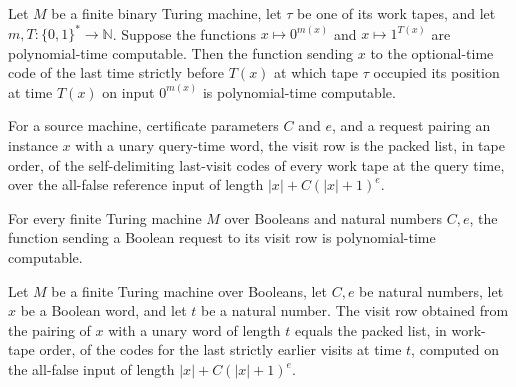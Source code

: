 \begin{lemma}
\label{Complexity.clPrev_native}
\leanok
{}
Let $M$ be a finite binary Turing machine, let $\tau$ be one of its work tapes, and let
$m,T:\{0,1\}^*\to\mathbb{N}$. Suppose the functions $x\mapsto 0^{m(x)}$ and $x\mapsto
1^{T(x)}$ are polynomial-time computable. Then the function sending $x$ to the
optional-time code of the last time strictly before $T(x)$ at which tape $\tau$ occupied
its position at time $T(x)$ on input $0^{m(x)}$ is polynomial-time computable.
\end{lemma}

\begin{definition}
\label{Complexity.clVisitRow}
\leanok
{}
For a source machine, certificate parameters $C$ and $e$, and a request pairing an instance $x$ with a unary query-time word, the visit row is the packed list, in tape order, of the self-delimiting last-visit codes of every work tape at the query time, over the all-false reference input of length $|x| + C(|x|+1)^e$.
\end{definition}

\begin{lemma}
\label{Complexity.clVisitRow_native}
\leanok
{}
For every finite Turing machine $M$ over Booleans and natural numbers $C,e$, the
function sending a Boolean request to its visit row is polynomial-time computable.
\end{lemma}

\begin{lemma}
\label{Complexity.clVisitRow_exact}
\leanok
{}
Let $M$ be a finite Turing machine over Booleans, let $C,e$ be natural numbers, let $x$
be a Boolean word, and let $t$ be a natural number. The visit row obtained from the
pairing of $x$ with a unary word of length $t$ equals the packed list, in work-tape
order, of the codes for the last strictly earlier visits at time $t$, computed on the
all-false input of length $|x|+C(|x|+1)^e$.
\end{lemma}

